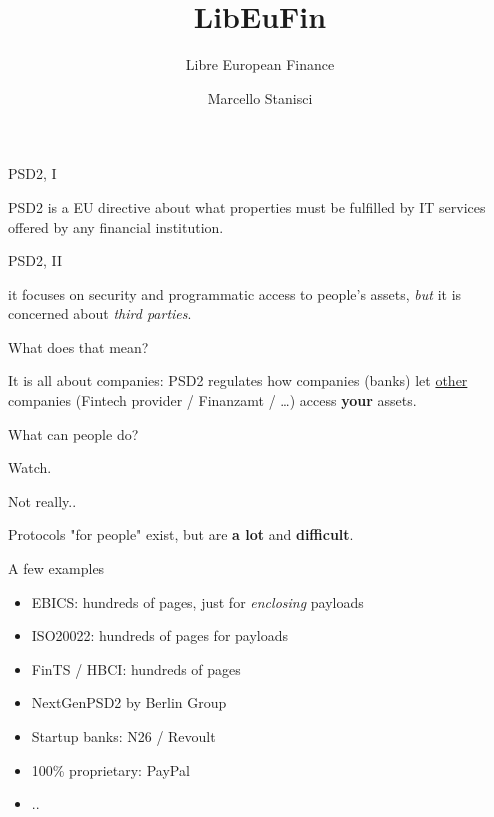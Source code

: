 \documentclass[pdf]{beamer}
\title{LibEuFin}
\subtitle{Libre European Finance}
\author{Marcello Stanisci}
\begin{document}

\begin{frame}
  \titlepage
\end{frame}

\begin{frame}{PSD2, I}
  \begin{center}
  PSD2 is a EU directive about what properties must be fulfilled by
  IT services offered by any financial institution.
  \end{center}
\end{frame}

\begin{frame}{PSD2, II}
  \begin{center}
  it focuses on security and programmatic access to people's assets,
  {\it but} it is concerned about {\it third parties}.
  \end{center}
\end{frame}

\begin{frame}{What does that mean?}
  \begin{center}
  It is all about companies: PSD2 regulates how companies (banks) let
  \underline{other} companies (Fintech provider / Finanzamt / \dots) access
  \textbf{your} assets.
  \end{center}
\end{frame}

\begin{frame}{What can people do?}
  \begin{center}
  Watch.
  \end{center}
\end{frame}

\begin{frame}{Not really..}
  \begin{center}
  Protocols "for people" exist, but are \textbf{a lot}
  and \textbf{difficult}.
  \end{center}
\end{frame}

\begin{frame}{A few examples}
  \begin{itemize}
    \item EBICS: hundreds of pages, just for {\it enclosing} payloads
    \item ISO20022: hundreds of pages for payloads
    \item FinTS / HBCI: hundreds of pages
    \item NextGenPSD2 by Berlin Group 
    \item Startup banks: N26 / Revoult
    \item 100\% proprietary: PayPal
    \item ..
  \end{itemize}
\end{frame}
\end{document}
